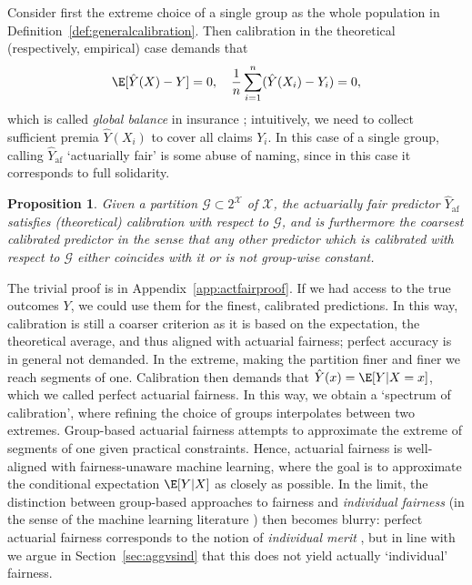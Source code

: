 \documentclass[11pt]{article} %
\makeatletter
\newcommand*{\ie}{i.e.\@\xspace}
\newcommand{\actfairpred}{\hat{Y}_{\mathrm{af}}}
\newtheorem{proposition}[theorem]{Proposition}
\makeatother
\begin{document}
  Consider first the extreme choice of a single group as the whole population in Definition~\ref{def:generalcalibration}. 
  Then calibration in the theoretical (respectively, empirical) case demands that  
\begin{displaymath}
\E[\hat{Y}(X) - Y]=0, 
\quad \frac{1}{n} \sum_{i=1}^n (\hat{Y}(X_i) - Y_i)=0,
\end{displaymath}
which is called \textit{global balance} in insurance \citep{denuit2021autocalibration}; intuitively, we need to collect sufficient premia $\hat{Y}(X_i)$ to cover all claims $Y_i$. In this case of a single group, calling $\actfairpred$ `actuarially fair' is some abuse of naming, since in this case it corresponds to full solidarity.
\begin{proposition}
\label{prop:actfair}
    Given a partition $\mathcal{G} \subset 2^{\mathcal{X}}$ of $\mathcal{X}$, the actuarially fair predictor $\actfairpred$ satisfies (theoretical) calibration with respect to $\mathcal{G}$, and is furthermore the coarsest calibrated predictor in the sense that any other predictor which is calibrated with respect to $\mathcal{G}$ either coincides with it or is not group-wise constant.
\end{proposition}
The trivial proof is in Appendix~\ref{app:actfairproof}.
If we had access to the true outcomes $Y$, we could use them for the finest, calibrated predictions. In this way, calibration is still a coarser criterion as it is based on the expectation, the theoretical average, and thus aligned with actuarial fairness; perfect accuracy is in general not demanded.
In the extreme, making the partition finer and finer we reach segments of one. Calibration then demands that $\hat{Y}(x) = \E[Y|X=x]$, which we called perfect actuarial fairness.
In this way, we obtain a `spectrum of calibration', where refining the choice of groups interpolates between two extremes. Group-based actuarial fairness attempts to approximate the extreme of segments of one given practical constraints. Hence, actuarial fairness is well-aligned with fairness-unaware machine learning, where the goal is to approximate the conditional expectation $\E[Y|X]$ as closely as possible. In the limit, the distinction between group-based approaches to fairness and \textit{individual fairness} (in the sense of the machine learning literature \citep{dwork2012fairness}) then becomes blurry: perfect actuarial fairness corresponds to the notion of \textit{individual merit} \citep{joseph2016fairness}, but in line with \citet{binns2020apparent} we argue in Section~\ref{sec:aggvsind} that this does not yield actually `individual' fairness.
\end{document}

